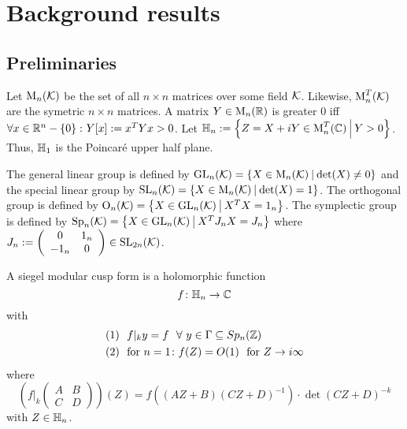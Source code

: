 
\section{Background results}

\subsection{Preliminaries}

Let $\operatorname{M}_n(\mathcal{K})$ be the set of all $n \times n$ matrices over some field $\mathcal{K}$.
Likewise, $\operatorname{M}_n^T(\mathcal{K})$ are the symetric $n \times n$ matrices.
A matrix $Y \in \operatorname{M}_n(\mathbb{R})$ is greater $0$ iff $\forall x \in \R^n - \Set{0} \colon Y[x] := x^T Y x > 0$.
Let $\HalfPlane_n := \Set{Z = X + iY \in \M_n^T(\C)}{Y > 0}$.
Thus, $\mathbb{H}_1$ is the Poincaré upper half plane.

The general linear group is defined by $\GL_n(\K) = \Set{X \in \M_n(\K)}{\det(X) \neq 0}$
and the special linear group by $\SL_n(\K) = \Set{X \in \M_n(\K)}{\det(X) = 1}$.
The orthogonal group is defined by $\Orth_n(\K) = \Set{X \in \GL_n(\K)}{X^T X = 1_n}$.
The symplectic group is defined by $\Sp_n(\K) = \Set{X \in \GL_n(\K)}{X^T J_n X = J_n}$
where $J_n := \left( \begin{array}{cc} 0 & 1_n \\ -1_n & 0 \end{array} \right) \in \operatorname{SL}_{2n}(\mathcal{K})$.

A siegel modular cusp form is a holomorphic function
\[ f \colon \mathbb{H}_n \rightarrow \mathbb{C} \]
with
\begin{align*}
(1) \ \ & f |_k y = f \ \ \forall \ y \in \Gamma \subseteq Sp_n(\mathbb{Z}) \\
(2) \ \ & \text{for } n = 1 \colon f(Z) = O(1) \ \text{ for } Z \rightarrow i \infty
\end{align*}
where
\[ \left( f|_k \left( \begin{array}{ccc}
A & B \\
C & D \end{array} \right) \right) (Z) =
f((AZ + B)(CZ + D)^{-1}) \cdot \det(CZ + D)^{-k} \]
with $Z \in \mathbb{H}_n$.

